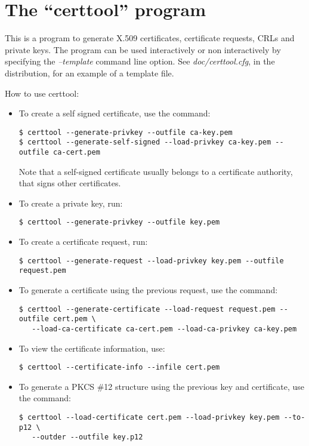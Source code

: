 \section{The ``certtool'' program}

This is a program to generate X.509 certificates, certificate requests, CRLs and
private keys. The program can be used interactively or non interactively by
specifying the \emph{--template} command line option. See \emph{doc/certtool.cfg},
in the distribution, for an example of a template file.

How to use certtool:

\begin{itemize}

\item To create a self signed certificate, use the command:
\begin{verbatim}
$ certtool --generate-privkey --outfile ca-key.pem
$ certtool --generate-self-signed --load-privkey ca-key.pem --outfile ca-cert.pem
\end{verbatim}
Note that a self-signed certificate usually belongs to a certificate
authority, that signs other certificates.

\item To create a private key, run:
\begin{verbatim}
$ certtool --generate-privkey --outfile key.pem
\end{verbatim}

\item To create a certificate request, run:
\begin{verbatim}
$ certtool --generate-request --load-privkey key.pem --outfile request.pem
\end{verbatim}

\item To generate a certificate using the previous request, use the command:
\begin{verbatim}
$ certtool --generate-certificate --load-request request.pem --outfile cert.pem \
   --load-ca-certificate ca-cert.pem --load-ca-privkey ca-key.pem
\end{verbatim}

\item To view the certificate information, use:
\begin{verbatim}
$ certtool --certificate-info --infile cert.pem
\end{verbatim}

\item To generate a PKCS \#12 structure using the previous key and certificate, use the command:
\begin{verbatim}
$ certtool --load-certificate cert.pem --load-privkey key.pem --to-p12 \
   --outder --outfile key.p12
\end{verbatim}


\end{itemize}

